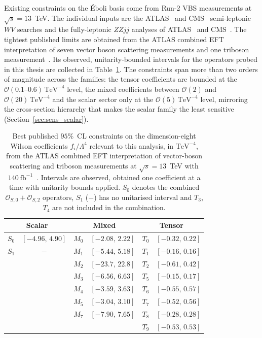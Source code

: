 Existing constraints on the Éboli basis come from Run-2 VBS measurements at $\sqrt{s}=13$~TeV. The individual inputs are the ATLAS~\cite{ATLAS:semileptonicVBS:2025} and CMS~\cite{CMS:semileptonicVBS:2022} semi-leptonic $WV$ searches and the fully-leptonic $ZZjj$ analyses of ATLAS~\cite{ATLAS:fullyleptonicVBS:2024} and CMS~\cite{CMS:fullyleptonicZZjj:2021}. The tightest published limits are obtained from the ATLAS combined EFT interpretation of seven vector boson scattering measurements and one triboson measurement~\cite{ATLAS:VBStribosoncombination:2026}. Its observed, unitarity-bounded intervals for the operators probed in this thesis are collected in Table~\ref{tab:best_limits}. The constraints span more than two orders of magnitude across the families: the tensor coefficients are bounded at the $\mathcal{O}(0.1\text{--}0.6)\,\mathrm{TeV}^{-4}$ level, the mixed coefficients between $\mathcal{O}(2)$ and $\mathcal{O}(20)\,\mathrm{TeV}^{-4}$ and the scalar sector only at the $\mathcal{O}(5)\,\mathrm{TeV}^{-4}$ level, mirroring the cross-section hierarchy that makes the scalar family the least sensitive (Section~\ref{sec:sens_scalar}). 
\begin{table}[htbp]
  \centering
  \caption{Best published $95\%$~CL constraints on the dimension-eight Wilson coefficients $f_i/\Lambda^4$ relevant to this analysis, in $\mathrm{TeV}^{-4}$, from the ATLAS combined EFT interpretation of vector-boson scattering and triboson measurements at $\sqrt{s}=13$~TeV with $140~\mathrm{fb}^{-1}$~\cite{ATLAS:VBStribosoncombination:2026}. Intervals are observed, obtained one coefficient at a time with unitarity bounds applied. $S_0$ denotes the combined $\mathcal{O}_{S,0}{+}\mathcal{O}_{S,2}$ operators, $S_1$ ($-$) has no unitarised interval and $T_3$, $T_4$ are not included in the combination.}
  \label{tab:best_limits}
  \begin{tabular}{|cc|cc|cc|}
    \hline
    \multicolumn{2}{|c|}{\textbf{Scalar}} & \multicolumn{2}{c|}{\textbf{Mixed}} & \multicolumn{2}{c|}{\textbf{Tensor}} \\
    \hline
    $S_0$ & $[-4.96,\,4.90]$ & $M_0$ & $[-2.08,\,2.22]$ & $T_0$ & $[-0.32,\,0.22]$ \\
    $S_1$ & $-$              & $M_1$ & $[-5.44,\,5.18]$ & $T_1$ & $[-0.16,\,0.16]$ \\
          &                  & $M_2$ & $[-23.7,\,22.8]$ & $T_2$ & $[-0.61,\,0.42]$ \\
          &                  & $M_3$ & $[-6.56,\,6.63]$ & $T_5$ & $[-0.15,\,0.17]$ \\
          &                  & $M_4$ & $[-3.59,\,3.63]$ & $T_6$ & $[-0.55,\,0.57]$ \\
          &                  & $M_5$ & $[-3.04,\,3.10]$ & $T_7$ & $[-0.52,\,0.56]$ \\
          &                  & $M_7$ & $[-7.90,\,7.65]$ & $T_8$ & $[-0.28,\,0.28]$ \\
          &                  &       &                  & $T_9$ & $[-0.53,\,0.53]$ \\
    \hline
  \end{tabular}
\end{table}

